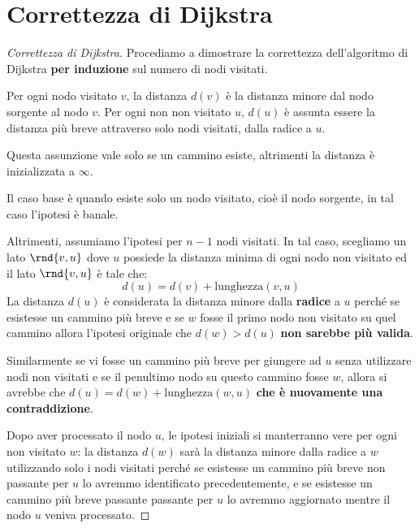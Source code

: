 \documentclass[\main/main.tex]{subfiles}
\begin{document}
\section{Correttezza di Dijkstra}
\begin{proof}[Correttezza di Dijkstra]
  Procediamo a dimostrare la correttezza dell'algoritmo di Dijkstra \textbf{per induzione} sul numero di nodi visitati.

  Per ogni nodo visitato \(v\), la distanza \(d(v)\) è la distanza minore dal nodo sorgente al nodo \(v\). Per ogni non non visitato \(u\), \(d(u)\) è assunta essere la distanza più breve attraverso solo nodi visitati, dalla radice a \(u\).

  Questa assunzione vale solo se un cammino esiste, altrimenti la distanza è inizializzata a \(\infty \).

  Il caso base è quando esiste solo un nodo visitato, cioè il nodo sorgente, in tal caso l'ipotesi è banale.

  Altrimenti, assumiamo l'ipotesi per \(n-1\) nodi visitati. In tal caso, scegliamo un lato \(\rnd{v,u}\) dove \(u\) possiede la distanza minima di ogni nodo non visitato ed il lato \(\rnd{v,u}\) è tale che:
  \[
    d(u) = d(v) + \text{lunghezza}(v, u)
  \]
  La distanza \(d(u)\) è considerata la distanza minore dalla \textbf{radice} a \(u\) perché se esistesse un cammino più breve e se \(w\) fosse il primo nodo non visitato su quel cammino allora l'ipotesi originale che \(d(w) > d(u)\) \textbf{non sarebbe più valida}.

  Similarmente se vi fosse un cammino più breve per giungere ad \(u\) senza utilizzare nodi non visitati e se il penultimo nodo su questo cammino fosse \(w\), allora si avrebbe che \(d(u) = d(w) + \text{lunghezza}(w, u)\) \textbf{che è nuovamente una contraddizione}.

  Dopo aver processato il nodo \(u\), le ipotesi iniziali si manterranno vere per ogni non visitato \(w\): la distanza \(d(w)\) sarà la distanza minore dalla radice a \(w\) utilizzando solo i nodi visitati perché se esistesse un cammino più breve non passante per \(u\) lo avremmo identificato precedentemente, e se esistesse un cammino più breve passante passante per \(u\) lo avremmo aggiornato mentre il nodo \(u\) veniva processato.
\end{proof}
\end{document}
